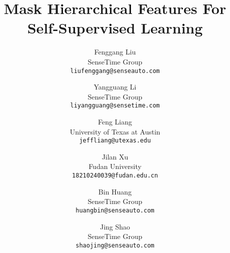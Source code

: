 \documentclass[10pt,twocolumn,letterpaper]{article}
\begin{document}
\title{Mask Hierarchical Features For Self-Supervised Learning}

\author{Fenggang Liu\\
SenseTime Group\\
{\tt\small liufenggang@senseauto.com}
\and
Yangguang Li\\
SenseTime Group\\
{\tt\small liyangguang@sensetime.com}
\and
Feng Liang\\
University of Texas at Austin\\
{\tt\small jeffliang@utexas.edu}
\and
Jilan Xu\\
 Fudan University\\
{\tt\small 18210240039@fudan.edu.cn}
\and
Bin Huang\\
SenseTime Group\\
{\tt\small huangbin@senseauto.com}
\and
Jing Shao\\
SenseTime Group\\
{\tt\small shaojing@senseauto.com}
}



\maketitle
\ificcvfinal\thispagestyle{empty}\fi
\end{document}
